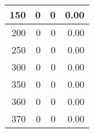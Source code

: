 \begin{longtable}{|r|r|r|r|}
		150                                                                                                                   & 0                                                    & 0                                                    & 0.00                                                                                                                   \\ \hline
		200                                                                                                                   & 0                                                    & 0                                                    & 0.00                                                                                                                   \\ \hline
		250                                                                                                                   & 0                                                    & 0                                                    & 0.00                                                                                                                   \\ \hline
		300                                                                                                                   & 0                                                    & 0                                                    & 0.00                                                                                                                   \\ \hline
		350                                                                                                                   & 0                                                    & 0                                                    & 0.00                                                                                                                   \\ \hline
		360                                                                                                                   & 0                                                    & 0                                                    & 0.00                                                                                                                   \\ \hline
		370                                                                                                                   & 0                                                    & 0                                                    & 0.00                                                                                                                   \\ \hline

\end{longtable}
